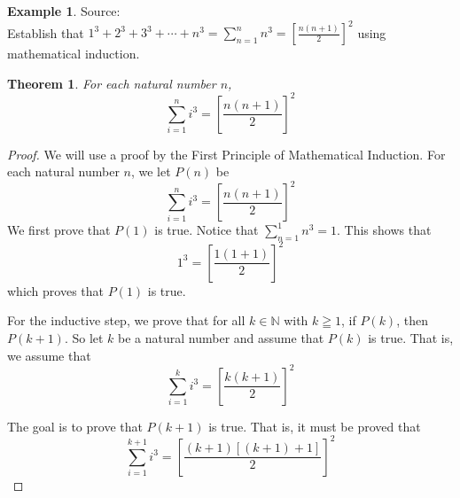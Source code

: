\documentclass{book}
\newtheorem{theorem}{Theorem}[section]
\theoremstyle{definition}
\newtheorem{example}{Example}[definition]
\theoremstyle{remark}
\newcommand{\bb}[1]{\mathbb{#1}}
\begin{document}
\newpage
\begin{example}
\label{sdf1}
Source: \cite[Chap.1, S.1.1, Prob.1.1, Q.1.E]{david} \\ 

Establish that $1^3 + 2^3 + 3^3  + \cdots + n^3 = \sum_{n=1}^{n}{n^3} = \left [\frac{n(n+1)}{2} \right ]^2$ using mathematical induction.
    \begin{tcolorbox}
        \begin{theorem}
            For each natural number $n$,
                \begin{equation*}
                    \sum_{i=1}^{n}{i^3} = \left [\frac{n(n+1)}{2} \right ]^2
                \end{equation*}
        \end{theorem}
    \end{tcolorbox}

    \begin{proof}
        We will use a proof by the First Principle of Mathematical Induction. For each natural number $n$, we let $P(n)$ be
            \begin{equation*}
                \sum_{i=1}^{n}{i^3} = \left [\frac{n(n+1)}{2} \right ]^2
            \end{equation*}
        We first prove that $P(1)$ is true. Notice that $\sum_{n=1}^{1}{n^3} = 1$. This shows that   
            \begin{equation*}
                 1^3 = \left [\frac{1(1+1)}{2} \right ]^2
            \end{equation*}
        which proves that $P(1)$ is true. 
        
        For the inductive step, we prove that for all $k \in \bb{N}$ with $k \geqq 1$, if $P(k)$, then $P(k+1)$. So let $k$ be a natural number and assume that $P(k)$ is true. That is, we assume that 
            \begin{equation*}
                \sum_{i=1}^{k}{i^3} = \left [\frac{k(k+1)}{2} \right ]^2
            \end{equation*}
        
        The goal is to prove that $P(k+1)$ is true. That is, it must be proved that  
            \begin{equation}
            \label{dne5}
                \sum_{i=1}^{k+1}{i^3} = \left [\frac{(k+1)[(k+1) + 1]}{2} \right ]^2            
            \end{equation}
        

\end{proof}
\end{example}
\end{document}
